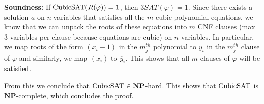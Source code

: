 \documentclass[11pt]{article}
\begin{document}
\textbf{Soundness:} If $\mathrm{CubicSAT}(R(\varphi)) = 1$, then $3SAT(\varphi) = 1$. Since there exists a solution $a$ on $n$ variables that satisfies all the $m$ cubic polynomial equations, we know that we can unpack the roots of these equations into $m$ CNF clauses (max 3 variables per clause because equations are cubic) on $n$ variables. In particular, we map roots of the form $(x_i - 1)$ in the $m_j^{th}$ polynomial to $y_i$ in the $m_j^{th}$ clause of $\varphi$ and similarly, we map $(x_i)$ to $\overline{y}_i$. This shows that all $m$ clauses of $\varphi$ will be satisfied.

From this we conclude that $\mathrm{CubicSAT} \in \mathbf{NP}$-hard. This shows that $\mathrm{CubicSAT}$ is \(\mathbf{NP}\)-complete, which concludes the proof.
\end{document}
